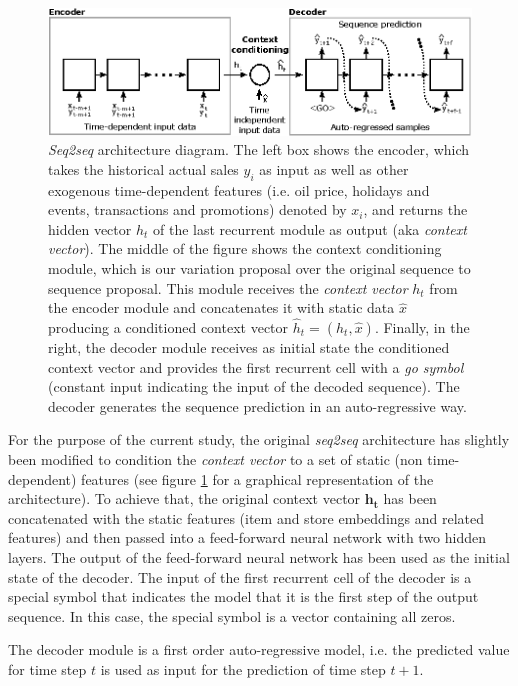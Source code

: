 \documentclass{elsarticle}
\begin{document}
	\begin{figure}[h!]
		\centering
		\includegraphics[width=1\linewidth]{img/s2s}
		\caption{\textit{Seq2seq} architecture diagram. The left box shows the encoder, which takes the historical actual sales $y_i$ as input as well as other exogenous time-dependent features (i.e. oil price, holidays and events, transactions and promotions) denoted by $x_i$, and returns the hidden vector $h_t$ of the last recurrent module as output (aka \textit{context vector}). The middle of the figure shows the context conditioning module, which is our variation proposal over the original sequence to sequence proposal. This module receives the \textit{context vector} $h_t$ from the encoder module and concatenates it with static data $\hat{x}$ producing a conditioned context vector $\hat{h}_t = (h_t, \hat{x})$. Finally, in the right, the decoder module receives as initial state the conditioned context vector and provides the first recurrent cell with a \textit{go symbol} (constant input indicating the input of the decoded sequence). The decoder generates the sequence prediction in an auto-regressive way.}
		\label{fig:s2s}
	\end{figure}
	
   For the purpose of the current study, the original \textit{seq2seq} architecture has slightly been modified to condition the \textit{context vector} to a set of static (non time-dependent) features (see figure \ref{fig:s2s} for a graphical representation of the architecture). To achieve that, the original context vector $\mathbf{h_t}$ has been concatenated with the static features (item and store embeddings and related features) and then passed into a feed-forward neural network with two hidden layers. The output of the feed-forward neural network has been used as the initial state of the decoder. The input of the first recurrent cell of the decoder is a special symbol that indicates the model that it is the first step of the output sequence. In this case, the special symbol is a vector containing all zeros. 
   
   The decoder module is a first order auto-regressive model, i.e. the predicted value for time step $t$ is used as input for the prediction of time step $t+1$.
   
\end{document}
